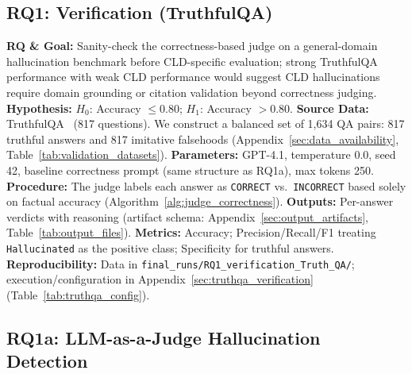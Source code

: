 \subsection{RQ1: Verification (TruthfulQA)}
\label{sec:rq1_verification}

\noindent\textbf{RQ \& Goal:} Sanity-check the correctness-based judge on a general-domain hallucination benchmark before CLD-specific evaluation; strong TruthfulQA performance with weak CLD performance would suggest CLD hallucinations require domain grounding or citation validation beyond correctness judging. \textbf{Hypothesis:} $H_0$: Accuracy $\leq 0.80$; $H_1$: Accuracy $> 0.80$. \textbf{Source Data:} TruthfulQA~\cite{lin2022truthfulqa} (817 questions). We construct a balanced set of 1{,}634 QA pairs: 817 truthful answers and 817 imitative falsehoods (Appendix~\ref{sec:data_availability}, Table~\ref{tab:validation_datasets}). \textbf{Parameters:} GPT-4.1, temperature 0.0, seed 42, baseline correctness prompt (same structure as RQ1a), max tokens 250. \textbf{Procedure:} The judge labels each answer as \texttt{CORRECT} vs.\ \texttt{INCORRECT} based solely on factual accuracy (Algorithm~\ref{alg:judge_correctness}). \textbf{Outputs:} Per-answer verdicts with reasoning (artifact schema: Appendix~\ref{sec:output_artifacts}, Table~\ref{tab:output_files}). \textbf{Metrics:} Accuracy; Precision/Recall/F1 treating \texttt{Hallucinated} as the positive class; Specificity for truthful answers. \textbf{Reproducibility:} Data in \texttt{final\_runs/RQ1\_verification\_Truth\_QA/}; execution/configuration in Appendix~\ref{sec:truthqa_verification} (Table~\ref{tab:truthqa_config}).

\subsection{RQ1a: LLM-as-a-Judge Hallucination Detection}
\label{sec:rq1a_experiments}

